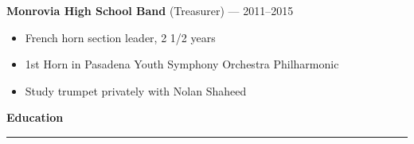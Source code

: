 \documentclass[12pt, oneside]{article}
\newcommand{\headingstyleJobs}[1] {
	{\fontsize{20pt}{1em}\selectfont \bf \textcolor{new_red}{#1}}
	\textcolor{new_red}{\rule{3.25in}{0.5pt}} \vspace{3pt}
}
\newcommand{\jobtitle}[2] {
	{\bf #1} {#2} \vspace{-10pt} \\
}
\begin{document}
\begin{flushleft}

\jobtitle{Monrovia High School Band}{(Treasurer) — 2011–2015}
\begin{itemize}
	\item French horn section leader, 2 1/2 years \\
	\item 1st Horn in Pasadena Youth Symphony Orchestra Philharmonic \\
	\item Study trumpet privately with Nolan Shaheed \\
\end{itemize}



\headingstyleJobs{Education}



\end{flushleft}
\end{document}
